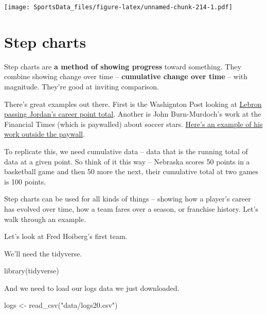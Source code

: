 \documentclass[
]{book}
\newenvironment{Shaded}{\begin{snugshade}}{\end{snugshade}}
\newcommand{\FunctionTok}[1]{\textcolor[rgb]{0.00,0.00,0.00}{#1}}
\newcommand{\NormalTok}[1]{#1}
\newcommand{\OtherTok}[1]{\textcolor[rgb]{0.56,0.35,0.01}{#1}}
\newcommand{\StringTok}[1]{\textcolor[rgb]{0.31,0.60,0.02}{#1}}
\begin{document}
\texttt{[image: SportsData\_files/figure-latex/unnamed-chunk-214-1.pdf]}

\hypertarget{step-charts}{%
\chapter{Step charts}\label{step-charts}}

Step charts are \textbf{a method of showing progress} toward something. They combine showing change over time -- \textbf{cumulative change over time} -- with magnitude. They're good at inviting comparison.

There's great examples out there. First is the Washignton Post looking at \href{https://www.washingtonpost.com/graphics/sports/lebron-james-michael-jordan-nba-scoring-list/?utm_term=.481074150849}{Lebron passing Jordan's career point total}. Another is John Burn-Murdoch's work at the Financial Times (which is paywalled) about soccer stars. \href{http://johnburnmurdoch.github.io/projects/goal-lines/CL/}{Here's an example of his work outside the paywall}.

To replicate this, we need cumulative data -- data that is the running total of data at a given point. So think of it this way -- Nebraska scores 50 points in a basketball game and then 50 more the next, their cumulative total at two games is 100 points.

Step charts can be used for all kinds of things -- showing how a player's career has evolved over time, how a team fares over a season, or franchise history. Let's walk through an example.

Let's look at Fred Hoiberg's first team.

We'll need the tidyverse.

\begin{Shaded}
\begin{Highlighting}[]
\FunctionTok{library}\NormalTok{(tidyverse)}
\end{Highlighting}
\end{Shaded}

And we need to load our logs data we just downloaded.

\begin{Shaded}
\begin{Highlighting}[]
\NormalTok{logs }\OtherTok{\textless{}{-}} \FunctionTok{read\_csv}\NormalTok{(}\StringTok{"data/logs20.csv"}\NormalTok{)}
\end{Highlighting}
\end{Shaded}
\end{document}

